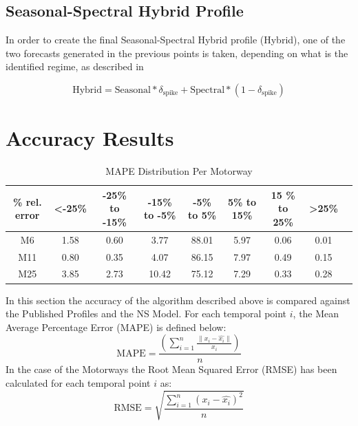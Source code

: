 \documentclass[conference, letterpaper]{IEEEtran}
\begin{document}
\subsection{Seasonal-Spectral Hybrid Profile}
In order to create the final Seasonal-Spectral Hybrid profile (Hybrid), one of the two forecasts generated in the previous points is taken, depending on what is the identified regime, as described in 

\begin{equation}
\textrm{Hybrid} = \textrm{Seasonal} * \delta_{\textrm{spike}} + \textrm{Spectral} * (1 - \delta_{\textrm{spike}})
\end{equation}

\section{Accuracy Results}
\begin{table}[bp]
	\caption{MAPE Distribution Per Motorway}
	\centering
	\begin{center}
		\begin{tabular}{|C|C|C|C|C|C|C|C|C|}
			\hline
			\textbf{\% rel. error}&{\textless -25\%}&{-25\%\textbf{ to }-15\%}&{-15\%\textbf{ to }-5\%}&{-5\%\textbf{ to }5\%}&{5\%\textbf{ to }15\%}&{15 \%\textbf{ to }25\%}&{\textgreater 25\%}\\
			\hline
			M6& 1.58& 0.60& 3.77& 88.01& 5.97& 0.06& 0.01\\
			\hline
			M11& 0.80& 0.35& 4.07& 86.15& 7.97& 0.49& 0.15\\
			\hline
			M25& 3.85& 2.73& 10.42& 75.12& 7.29& 0.33& 0.28\\
			\hline
		\end{tabular}
		\label{mapeglobal}
	\end{center}
\end{table}
  
In this section the accuracy of the algorithm described above is compared against the Published Profiles and the NS Model. 
For each temporal point $i$, the Mean Average Percentage Error (MAPE) is defined below:
\begin{equation}
\textrm{MAPE} =\frac{ \left( \sum_{i=1}^{n} \frac{\|x_i - \hat{x_i}\|}{x_i}\right)}{n}
\end{equation}
In the case of the Motorways the Root Mean Squared Error (RMSE) has been calculated for each temporal point $i$ as:
\begin{equation}
\textrm{RMSE} = \sqrt{\frac{\sum_{i=1}^{n} (x_i - \hat{x_i})^2}{n}}
\end{equation}
\end{document}
